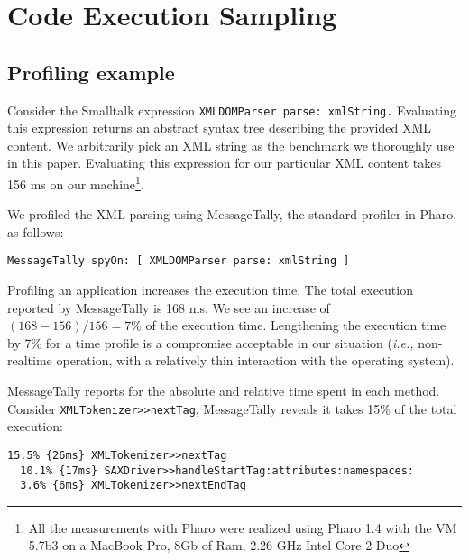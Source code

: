 \documentclass{sig-alternate}
\newcommand{\ct}{\lstinline[backgroundcolor=\color{white},basicstyle=\footnotesize\ttfamily]}
\newcommand{\ie}{\emph{i.e.,}\xspace}
\newcommand{\seclabel}[1]{\label{sec:#1}}
\begin{document}
\section{Code Execution Sampling} \seclabel{executionSampling}

\subsection{Profiling example}

Consider the Smalltalk expression \ct{XMLDOMParser parse: xmlString.} Evaluating this expression returns an abstract syntax tree describing the provided XML content. 
We arbitrarily pick an XML string as the benchmark we thoroughly use in this paper. 
Evaluating this expression for our particular XML content takes 156 ms on our machine\footnote{All the measurements with Pharo were realized using Pharo 1.4 with the VM 5.7b3 on a MacBook Pro, 8Gb of Ram, 2.26 GHz Intel Core 2 Duo}. %


We profiled the XML parsing using MessageTally, the standard profiler in Pharo, as follows:

\begin{lstlisting}
MessageTally spyOn: [ XMLDOMParser parse: xmlString ]
\end{lstlisting}

Profiling an application increases the execution time. 
The total execution reported by MessageTally is 168 ms. We see an increase of $(168 - 156) / 156 = 7\%$ of the execution time. Lengthening the execution time by 7\% for a time profile is a compromise acceptable in our situation (\ie non-realtime operation, with a relatively thin interaction with the operating system).

MessageTally reports for the absolute and relative time spent in each method. Consider \ct{XMLTokenizer>>nextTag}, MessageTally reveals it takes 15\% of the total execution:

\begin{lstlisting}
15.5% {26ms} XMLTokenizer>>nextTag
  10.1% {17ms} SAXDriver>>handleStartTag:attributes:namespaces:
  3.6% {6ms} XMLTokenizer>>nextEndTag
\end{lstlisting}
\end{document}
